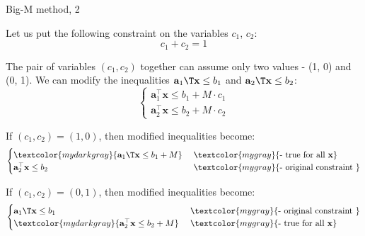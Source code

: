 \documentclass{beamer}
\begin{document}
\begin{frame}{Big-M method, 2}
	\begin{flushleft}
		
		Let us put the following constraint on the variables $c_1$, $c_2$:
		\begin{equation}
			c_1 + c_2 = 1
		\end{equation}
		
		The pair of variables $(c_1, c_2)$ together can assume only two values - (1, 0) and (0, 1). We can modify the inequalities $\mathbf{a}_1\T \mathbf{x} \leq b_1$ and $\mathbf{a}_2\T \mathbf{x} \leq b_2$:
		\begin{equation}
			\begin{cases}
				\mathbf{a}_1^\top \mathbf{x} \leq b_1 + M \cdot c_1 \\
				\mathbf{a}_2^\top \mathbf{x} \leq b_2 + M \cdot c_2
			\end{cases}
		\end{equation}
		
		If $(c_1, c_2) = (1, 0)$, then modified inequalities become:
		\begin{equation}
			\begin{cases}
				\textcolor{mydarkgray}{ \mathbf{a}_1\T \mathbf{x} \leq b_1 + M }  
				\ & \textcolor{mygray}{\text{- true for all }  \mathbf{x}}
				\\
				\mathbf{a}_2^\top \mathbf{x} \leq b_2 
				\ & \textcolor{mygray}{\text{- original constraint } }
			\end{cases}
		\end{equation}
		
		 
		 If $(c_1, c_2) = (0, 1)$, then modified inequalities become:
		 \begin{equation}
		 	\begin{cases}
		 		\mathbf{a}_1\T \mathbf{x} \leq b_1  
		 		\ & \textcolor{mygray}{\text{- original constraint } }
		 		\\
		 		\textcolor{mydarkgray}{\mathbf{a}_2^\top \mathbf{x} \leq b_2  + M}
		 		\ & \textcolor{mygray}{\text{- true for all }  \mathbf{x}}
		 	\end{cases}
		 \end{equation}
		
		
		
	\end{flushleft}
\end{frame}
\end{document}

